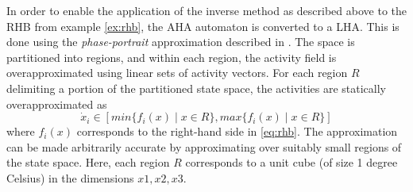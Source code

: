 \documentclass{llncs}
\begin{document}
\begin{example} \label{ex:rhb2}
  In order to enable the application of the inverse method as
  described above to the RHB from example \ref{ex:rhb}, the AHA
  automaton is converted to a LHA.  This is done using the {\em
    phase-portrait} approximation described in \cite{HW:96}. The space
  is partitioned into regions, and within each region, the activity
  field is overapproximated using linear sets of activity vectors.
  For each region $R$ delimiting a portion of the partitioned state
  space, the activities are statically overapproximated as
  \begin{equation}
    \dot{x}_i \in \left[ min \{f_i(x) \mid x \in R \}, max \{f_i(x) \mid x \in R \} \right]
  \end{equation}
  where $f_i(x)$ corresponds to the right-hand side in \eqref{eq:rhb}.
  The approximation can be made arbitrarily accurate by approximating
  over suitably small regions of the state space. Here, each region
  $R$ corresponds to a unit cube (of size 1 degree Celsius) in the
  dimensions $x1,x2,x3$.


\end{example}
\end{document}
